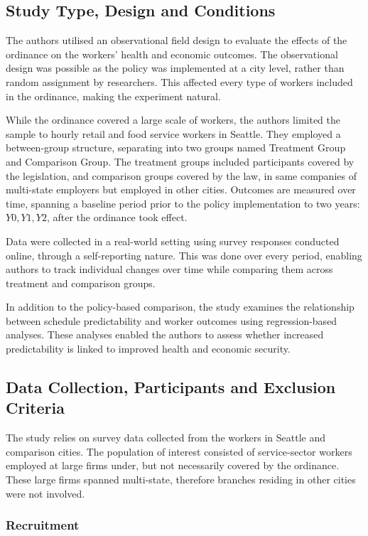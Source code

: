 \documentclass{article}
\begin{document}
	\subsection{Study Type, Design and Conditions}
	
	The authors utilised an observational field design to evaluate the effects of the ordinance on the workers' health and economic outcomes. The observational design was possible as the policy was implemented at a city level, rather than random assignment by researchers. This affected every type of workers included in the ordinance, making the experiment natural.
	
	While the ordinance covered a large scale of workers, the authors limited the sample to hourly retail and food service workers in Seattle. They employed a between-group structure, separating into two groups named Treatment Group and Comparison Group. The treatment groups included participants covered by the legislation, and comparison groups covered by the law, in same companies of multi-state employers but employed in other cities. Outcomes are measured over time, spanning a baseline period prior to the policy implementation to two years: $Y0, Y1, Y2$, after the ordinance took effect.

	Data were collected in a real-world setting using survey responses conducted online, through a self-reporting nature. This was done over every period, enabling authors to track individual changes over time while comparing them across treatment and comparison groups.
	
	In addition to the policy-based comparison, the study examines the relationship between schedule predictability and worker outcomes using regression-based analyses. These analyses enabled the authors to assess whether increased predictability is linked to improved health and economic security.

	\subsection{Data Collection, Participants and Exclusion Criteria}
	
	The study relies on survey data collected from the workers in Seattle and comparison cities. The population of interest consisted of service-sector workers employed at large firms under, but not necessarily covered by the ordinance. These large firms spanned multi-state, therefore branches residing in other cities were not involved.
	
	\subsubsection{Recruitment}
	
\end{document}
